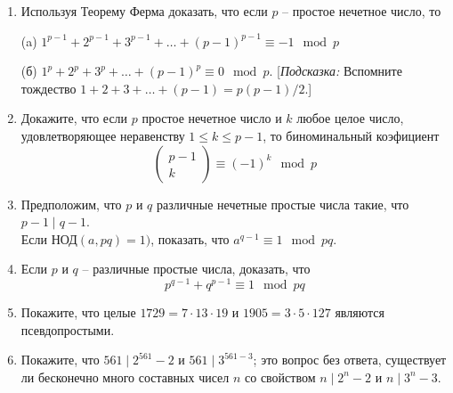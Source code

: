 \documentclass[4apaper,11pt]{article}
\begin{document}
\begin{enumerate}
(б) Если $a^p\equiv b^p\mod p$, то $a\equiv b\mod p^2$. [\textsl{Подсказка:} Из пункта (а) $a=b+pk$ для некоторого k, так что $a^p-b^p=(b+pk)^p-b^p$; теперь покажем, что $p^2$ делит последнее выражение]
\item Используя Теорему Ферма доказать, что если $p$ -- простое нечетное число, то

(a) $1^{p-1}+2^{p-1}+3^{p-1}+\dots+(p-1)^{p-1}\equiv -1\mod p$

(б) $1^p+2^p+3^p+\dots+(p-1)^p\equiv 0 \mod p$. [\textsl{Подсказка:} Вспомните тождество $1+2+3+\dots+(p-1)=p(p-1)/2$.]
\item Докажите, что если $p$ простое нечетное число и $k$ любое целое число, удовлетворяющее неравенству $1\leq k \leq p-1$, то биноминальный коэфициент \[\begin{pmatrix}
p-1\\k
\end{pmatrix}\equiv (-1)^k\mod p\]
\item Предположим, что $p$ и $q$ различные нечетные простые числа такие, что $p-1\mid q-1$.\\ Если $\text{НОД}(a,pq)=1)$, показать, что $a^{q-1}\equiv 1\mod pq$.
\item Если $p$ и $q$ -- различные простые числа, доказать, что 
\[p^{q-1}+q^{p-1}\equiv 1\mod pq\]
\item Покажите, что целые $1729=7\cdot13\cdot19$ и $1905=3\cdot5\cdot127$ являются псевдопростыми.
\item Покажите, что $561\mid 2^{561}-2$ и $561\mid 3^{561-3}$; это вопрос без ответа,
существует ли бесконечно много составных чисел $n$ со свойством $n\mid2^n-2$ и $n\mid 3^n-3$.
\end{enumerate}
\end{document}
